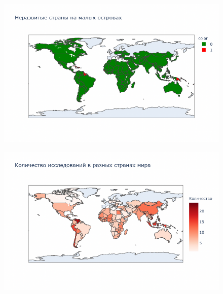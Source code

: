 \documentclass{beamer}
\begin{document}
\begin{frame}

\begin{figure}
	\centering
	\includegraphics[width=120mm]{19.png}
\end{figure}


\end{frame}


\begin{frame}

\begin{figure}
	\centering
	\includegraphics[width=125mm]{20.png}
\end{figure}


\end{frame}
\end{document}
